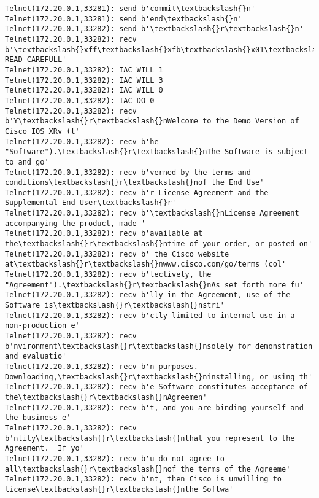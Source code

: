 \documentclass[11pt]{article}
\begin{document}
\begin{Verbatim}[commandchars=\\\{\}]
Telnet(172.20.0.1,33281): send b'commit\textbackslash{}n'
Telnet(172.20.0.1,33281): send b'end\textbackslash{}n'
Telnet(172.20.0.1,33282): send b'\textbackslash{}r\textbackslash{}n'
Telnet(172.20.0.1,33282): recv b'\textbackslash{}xff\textbackslash{}xfb\textbackslash{}x01\textbackslash{}xff\textbackslash{}xfb\textbackslash{}x03\textbackslash{}xff\textbackslash{}xfb\textbackslash{}x00\textbackslash{}xff\textbackslash{}xfd\textbackslash{}x00\textbackslash{}x1b]0;xrv2\textbackslash{}x07\textbackslash{}r\textbackslash{}n\textbackslash{}r\textbackslash{}nIMPORTANT:  READ CAREFULL'
Telnet(172.20.0.1,33282): IAC WILL 1
Telnet(172.20.0.1,33282): IAC WILL 3
Telnet(172.20.0.1,33282): IAC WILL 0
Telnet(172.20.0.1,33282): IAC DO 0
Telnet(172.20.0.1,33282): recv b'Y\textbackslash{}r\textbackslash{}nWelcome to the Demo Version of Cisco IOS XRv (t'
Telnet(172.20.0.1,33282): recv b'he "Software").\textbackslash{}r\textbackslash{}nThe Software is subject to and go'
Telnet(172.20.0.1,33282): recv b'verned by the terms and conditions\textbackslash{}r\textbackslash{}nof the End Use'
Telnet(172.20.0.1,33282): recv b'r License Agreement and the Supplemental End User\textbackslash{}r'
Telnet(172.20.0.1,33282): recv b'\textbackslash{}nLicense Agreement accompanying the product, made '
Telnet(172.20.0.1,33282): recv b'available at the\textbackslash{}r\textbackslash{}ntime of your order, or posted on'
Telnet(172.20.0.1,33282): recv b' the Cisco website at\textbackslash{}r\textbackslash{}nwww.cisco.com/go/terms (col'
Telnet(172.20.0.1,33282): recv b'lectively, the "Agreement").\textbackslash{}r\textbackslash{}nAs set forth more fu'
Telnet(172.20.0.1,33282): recv b'lly in the Agreement, use of the Software is\textbackslash{}r\textbackslash{}nstri'
Telnet(172.20.0.1,33282): recv b'ctly limited to internal use in a non-production e'
Telnet(172.20.0.1,33282): recv b'nvironment\textbackslash{}r\textbackslash{}nsolely for demonstration and evaluatio'
Telnet(172.20.0.1,33282): recv b'n purposes.  Downloading,\textbackslash{}r\textbackslash{}ninstalling, or using th'
Telnet(172.20.0.1,33282): recv b'e Software constitutes acceptance of the\textbackslash{}r\textbackslash{}nAgreemen'
Telnet(172.20.0.1,33282): recv b't, and you are binding yourself and the business e'
Telnet(172.20.0.1,33282): recv b'ntity\textbackslash{}r\textbackslash{}nthat you represent to the Agreement.  If yo'
Telnet(172.20.0.1,33282): recv b'u do not agree to all\textbackslash{}r\textbackslash{}nof the terms of the Agreeme'
Telnet(172.20.0.1,33282): recv b'nt, then Cisco is unwilling to license\textbackslash{}r\textbackslash{}nthe Softwa'

\end{Verbatim}
\end{document}
